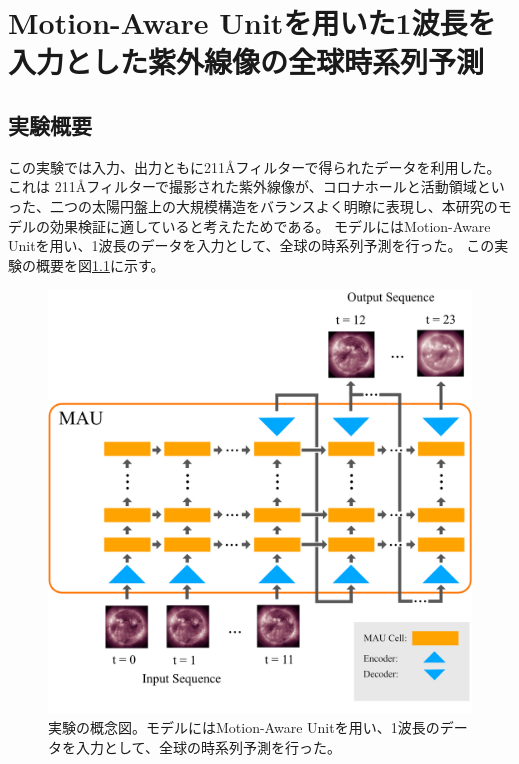 \chapter{Motion-Aware Unitを用いた1波長を入力とした紫外線像の全球時系列予測}
  \section{実験概要}
  この実験では入力、出力ともに211Åフィルターで得られたデータを利用した。
  これは 211Åフィルターで撮影された紫外線像が、コロナホールと活動領域といった、二つの太陽円盤上の大規模構造をバランスよく明瞭に表現し、本研究のモデルの効果検証に適していると考えたためである。
  モデルにはMotion-Aware Unitを用い、1波長のデータを入力として、全球の時系列予測を行った。
  この実験の概要を図\ref{fig:exp1_overview}に示す。

  \begin{figure}[htbp]
    \centering
    \includegraphics[width=\textwidth]{figures/exp1/exp1_concept.jpg}
    \caption{実験の概念図。モデルにはMotion-Aware Unitを用い、1波長のデータを入力として、全球の時系列予測を行った。}
    \label{fig:exp1_overview}
  \end{figure}

